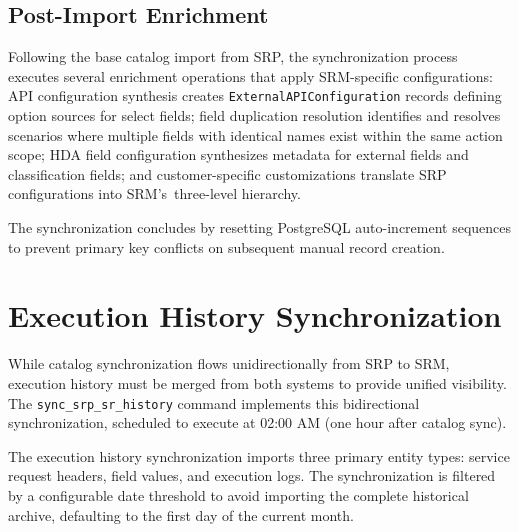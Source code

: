 \subsection{Post-Import Enrichment}

Following the base catalog import from SRP, the synchronization process executes several enrichment operations that apply SRM-specific configurations: API configuration synthesis creates \texttt{ExternalAPIConfiguration} records defining option sources for select fields; field duplication resolution identifies and resolves scenarios where multiple fields with identical names exist within the same action scope; HDA field configuration synthesizes metadata for external fields and classification fields; and customer-specific customizations translate SRP configurations into SRM's~three-level hierarchy.

The synchronization concludes by resetting PostgreSQL auto-increment sequences to prevent primary key conflicts on subsequent manual record creation.

\section{Execution History Synchronization}

While catalog synchronization flows unidirectionally from SRP to SRM, execution history must be merged from both systems to provide unified visibility. The \texttt{sync\_srp\_sr\_history} command implements this bidirectional synchronization, scheduled to execute at 02:00 AM (one hour after catalog sync).

The execution history synchronization imports three primary entity types: service request headers, field values, and execution logs. The synchronization is filtered by a configurable date threshold to avoid importing the complete historical archive, defaulting to the first day of the current month.


